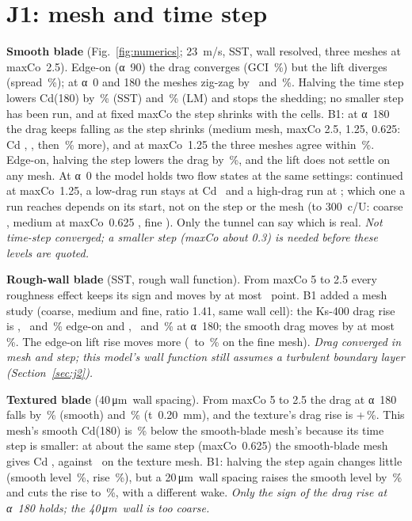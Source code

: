 \documentclass[10pt]{article}
\newcommand{\um}{\,\si{\micro\metre}}
\begin{document}
\section{J1: mesh and time step}\label{sec:j1}
\textbf{Smooth blade} (Fig.~\ref{fig:numerics}; 23~m/s, SST, wall resolved, three meshes at maxCo~2.5). Edge-on (α~90) the drag converges
(GCI \nGciCdNinety\,\%) but the lift diverges (spread \nSpreadClNinety\,\%); at α~0 and 180 the meshes
zig-zag by \nSpreadCdZero\ and \nSpreadCdOneEighty\,\%. Halving the time step lowers Cd(180) by
\nTsDropSST\,\% (SST) and \nTsDropLM\,\% (LM) and stops the shedding; no smaller step has been run, and at
fixed maxCo the step shrinks with the cells. B1: at α~180 the drag keeps falling as the step shrinks
(medium mesh, maxCo 2.5, 1.25, 0.625: Cd \nMedCdTwoFive, \nMedCdOneTwoFive, then \nBoneSOneStep\,\% more),
and at maxCo~1.25 the three meshes agree within \nBoneSOneSpread\,\%. Edge-on, halving the step lowers the
drag by \nSecNinetyStep\,\%, and the lift does not settle on any mesh. At α~0 the model holds two flow
states at the same settings: continued at maxCo~1.25, a low-drag run stays at Cd \nRestartContCd\ and a
high-drag run at \nRestartHystCd; which one a run reaches depends on its start, not on the step or the
mesh (to 300~c/U: coarse \nBoneSTwoCoarse, medium at maxCo~0.625 \nBoneSTwoMed, fine \nBoneSTwoFine). Only
the tunnel can say which is real. \emph{Not time-step converged; a smaller step (maxCo about 0.3) is needed
before these levels are quoted.}

\textbf{Rough-wall blade} (SST, rough wall function). From maxCo 5 to 2.5 every roughness effect keeps its
sign and moves by at most \nWfMaxMove\ point. B1 added a mesh study (coarse, medium and fine, ratio 1.41,
same wall cell): the Ks-400 drag rise is \nWfMeshNinetyCdC, \nWfMeshNinetyCdM\ and \nWfMeshNinetyCdF\,\%
edge-on and \nWfMeshOneEightyCdC, \nWfMeshOneEightyCdM\ and \nWfMeshOneEightyCdF\,\% at α~180; the smooth
drag moves by at most \nWfMeshOneEightyLevel\,\%. The edge-on lift rise moves more (\nWfMeshNinetyClM\ to
\nWfMeshNinetyClF\,\% on the fine mesh). \emph{Drag converged in mesh and step; this model's wall
function still assumes a turbulent boundary layer (Section~\ref{sec:j2}).}

\textbf{Textured blade} (40\um\ wall spacing). From maxCo 5 to 2.5 the drag at α~180 falls by
\nTexDropSmooth\,\% (smooth) and \nTexDropTex\,\% (t~0.20~mm), and the texture's drag rise is
+\nTexEffLong\,\%. This mesh's smooth Cd(180) is \nTexGapPct\,\% below the smooth-blade mesh's because its
time step is smaller: at about the same step (maxCo~0.625) the smooth-blade mesh gives Cd \nMedCdSixTwoFive,
against \nTexCdSmooth\ on the texture mesh.
B1: halving the step again changes little (smooth level \nBoneTOneLevel\,\%, rise \nBoneTOneEff\,\%), but a
20\um\ wall spacing raises the smooth level by \nBoneTTwoLevel\,\% and cuts the rise to \nBoneTTwoEff\,\%,
with a different wake. \emph{Only the sign of the drag rise at α~180 holds; the 40\um\ wall is too coarse.}
\end{document}
